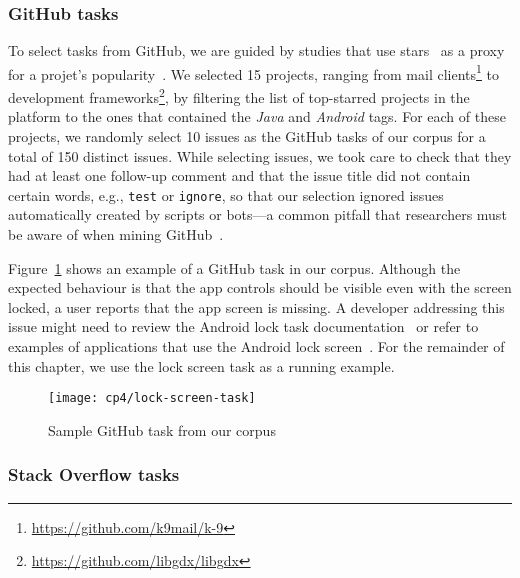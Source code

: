 \subsubsection{GitHub tasks}

To select tasks from GitHub, we are guided by studies that use 
stars~\cite{borges2016, borges2018}
as a proxy for a projet's popularity~\cite{Ferreira2016, Xavier2020}.
We selected 15 projects,
ranging from mail clients\footnote{\url{https://github.com/k9mail/k-9}}
to development frameworks\footnote{\url{https://github.com/libgdx/libgdx}},
by filtering the list of top-starred projects in the platform to the ones that contained the \textit{Java} and \textit{Android} tags.
For each of these projects, we randomly select 10 issues as the GitHub tasks of our corpus for a total of 150 distinct issues.
While selecting issues, we took care to check that they had at least one follow-up comment and that the issue title did not contain certain words, e.g., {\small \texttt{test}} or {\small  \texttt{ignore}},
so that our selection ignored issues automatically created by scripts or bots---a common pitfall that researchers must be aware of when mining GitHub~\cite{kalliamvakou2014}.


Figure~\ref{fig:lock-screen-task} shows an example of a GitHub task in our corpus.
Although the expected behaviour is that the app controls should be visible even with the screen locked,  a user reports that the app screen is missing.
A developer addressing this issue might need to review the Android lock task documentation~\cite{apiLockTask}
or refer to examples of applications that use the Android lock screen~\cite{mediumLockApp}.
For the remainder of this chapter, we use the lock screen task as a running example.


\begin{figure}
    \centering
    \texttt{[image: cp4/lock-screen-task]}
    \caption{Sample GitHub task from our corpus}
    \label{fig:lock-screen-task}
\end{figure}



\subsubsection{Stack Overflow tasks}



